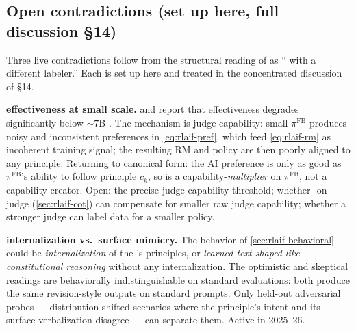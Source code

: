 \subsection{Open contradictions (set up here, full discussion §14)}
\label{sec:rlaif-contradictions}

Three live contradictions follow from the structural reading of  as
`` with a different labeler.'' Each is set up here and treated in
the concentrated discussion of §14.

\begin{contradiction}
\textbf{ effectiveness at small scale.}  and 
report that  effectiveness degrades significantly below
$\sim\!7$B . The mechanism is judge-capability: small
$\pi^{\mathrm{FB}}$ produces noisy and inconsistent preferences in
\cref{eq:rlaif-pref}, which feed \cref{eq:rlaif-rm} as incoherent
training signal; the resulting RM and policy are then poorly aligned
to any principle. Returning to canonical form: the AI preference is
only as good as $\pi^{\mathrm{FB}}$'s ability to follow principle
$c_k$, so  is a capability-\emph{multiplier} on $\pi^{\mathrm{FB}}$,
not a capability-creator. Open: the precise judge-capability
threshold; whether -on-judge (\cref{sec:rlaif-cot}) can compensate
for smaller raw judge capability; whether a stronger judge can label
data for a smaller policy.
\end{contradiction}

\begin{contradiction}
\textbf{ internalization vs.\ surface mimicry.} The 
behavior of \cref{sec:rlaif-behavioral} could be
\emph{internalization} of the 's principles, or \emph{learned
text shaped like constitutional reasoning} without any
internalization. The optimistic and skeptical readings are
behaviorally indistinguishable on standard evaluations: both produce
the same revision-style outputs on standard prompts. Only held-out
adversarial probes — distribution-shifted scenarios where the
principle's intent and its surface verbalization disagree — can
separate them. Active in 2025--26.
\end{contradiction}

